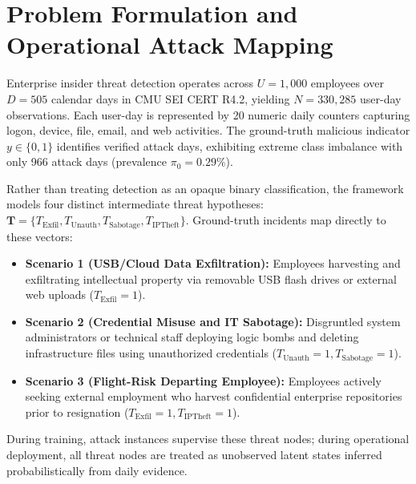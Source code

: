 \documentclass[12pt,a4paper]{report}
\begin{document}
\section{Problem Formulation and Operational Attack Mapping}
Enterprise insider threat detection operates across $U = 1,000$ employees over $D = 505$ calendar days in CMU SEI CERT R4.2, yielding $N = 330,285$ user-day observations. Each user-day is represented by 20 numeric daily counters capturing logon, device, file, email, and web activities. The ground-truth malicious indicator $y \in \{0, 1\}$ identifies verified attack days, exhibiting extreme class imbalance with only 966 attack days (prevalence $\pi_0 = 0.29\%$).

Rather than treating detection as an opaque binary classification, the framework models four distinct intermediate threat hypotheses: $\mathbf{T} = \{T_{\text{Exfil}}, T_{\text{Unauth}}, T_{\text{Sabotage}}, T_{\text{IPTheft}}\}$. Ground-truth incidents map directly to these vectors:
\begin{itemize}
    \item \textbf{Scenario 1 (USB/Cloud Data Exfiltration):} Employees harvesting and exfiltrating intellectual property via removable USB flash drives or external web uploads ($T_{\text{Exfil}} = 1$).
    \item \textbf{Scenario 2 (Credential Misuse and IT Sabotage):} Disgruntled system administrators or technical staff deploying logic bombs and deleting infrastructure files using unauthorized credentials ($T_{\text{Unauth}} = 1, T_{\text{Sabotage}} = 1$).
    \item \textbf{Scenario 3 (Flight-Risk Departing Employee):} Employees actively seeking external employment who harvest confidential enterprise repositories prior to resignation ($T_{\text{Exfil}} = 1, T_{\text{IPTheft}} = 1$).
\end{itemize}
During training, attack instances supervise these threat nodes; during operational deployment, all threat nodes are treated as unobserved latent states inferred probabilistically from daily evidence.
\end{document}
